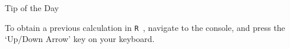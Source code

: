 \documentclass[xcolor=svgnames, 10pt]{beamer}
\newcommand{\R}{{\tt R }}
\begin{document}
\begin{frame}{Tip of the Day}
\begin{block}{}
To obtain a previous calculation in \R, navigate to the console, and press the  `Up/Down Arrow' key on your keyboard. 
\end{block}
\end{frame}




%
%
%
%
%
%
%
%
\end{document}
